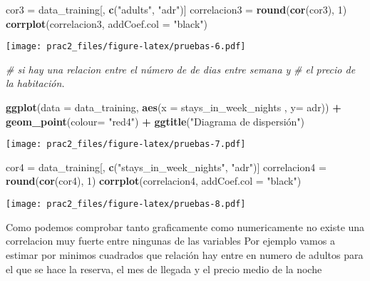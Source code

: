 \documentclass[]{article}
\newenvironment{Shaded}{\begin{snugshade}}{\end{snugshade}}
\newcommand{\CommentTok}[1]{\textcolor[rgb]{0.56,0.35,0.01}{\textit{#1}}}
\newcommand{\DataTypeTok}[1]{\textcolor[rgb]{0.13,0.29,0.53}{#1}}
\newcommand{\DecValTok}[1]{\textcolor[rgb]{0.00,0.00,0.81}{#1}}
\newcommand{\KeywordTok}[1]{\textcolor[rgb]{0.13,0.29,0.53}{\textbf{#1}}}
\newcommand{\NormalTok}[1]{#1}
\newcommand{\OperatorTok}[1]{\textcolor[rgb]{0.81,0.36,0.00}{\textbf{#1}}}
\newcommand{\StringTok}[1]{\textcolor[rgb]{0.31,0.60,0.02}{#1}}
\begin{document}
\begin{Shaded}
\begin{Highlighting}[]
\NormalTok{cor3 =}\StringTok{ }\NormalTok{data_training[, }\KeywordTok{c}\NormalTok{(}\StringTok{"adults"}\NormalTok{, }\StringTok{"adr"}\NormalTok{)]}
\NormalTok{correlacion3 =}\StringTok{ }\KeywordTok{round}\NormalTok{(}\KeywordTok{cor}\NormalTok{(cor3), }\DecValTok{1}\NormalTok{)}
\KeywordTok{corrplot}\NormalTok{(correlacion3, }\DataTypeTok{addCoef.col =} \StringTok{"black"}\NormalTok{)}
\end{Highlighting}
\end{Shaded}

\texttt{[image: prac2\_files/figure-latex/pruebas-6.pdf]}

\begin{Shaded}
\begin{Highlighting}[]
\CommentTok{# si hay una relacion entre el número de de dias entre semana  y}
\CommentTok{# el precio de la habitación.}

\KeywordTok{ggplot}\NormalTok{(}\DataTypeTok{data =}\NormalTok{ data_training, }\KeywordTok{aes}\NormalTok{(}\DataTypeTok{x =}\NormalTok{ stays_in_week_nights , }\DataTypeTok{y=}\NormalTok{ adr)) }\OperatorTok{+}
\StringTok{  }\KeywordTok{geom_point}\NormalTok{(}\DataTypeTok{colour=} \StringTok{"red4"}\NormalTok{) }\OperatorTok{+}
\StringTok{  }\KeywordTok{ggtitle}\NormalTok{(}\StringTok{"Diagrama de dispersión")}
\end{Highlighting}
\end{Shaded}

\texttt{[image: prac2\_files/figure-latex/pruebas-7.pdf]}

\begin{Shaded}
\begin{Highlighting}[]
\NormalTok{cor4 =}\StringTok{ }\NormalTok{data_training[, }\KeywordTok{c}\NormalTok{(}\StringTok{"stays_in_week_nights"}\NormalTok{, }\StringTok{"adr"}\NormalTok{)]}
\NormalTok{correlacion4 =}\StringTok{ }\KeywordTok{round}\NormalTok{(}\KeywordTok{cor}\NormalTok{(cor4), }\DecValTok{1}\NormalTok{)}
\KeywordTok{corrplot}\NormalTok{(correlacion4, }\DataTypeTok{addCoef.col =} \StringTok{"black"}\NormalTok{)}
\end{Highlighting}
\end{Shaded}

\texttt{[image: prac2\_files/figure-latex/pruebas-8.pdf]}

Como podemos comprobar tanto graficamente como numericamente no existe
una correlacion muy fuerte entre ningunas de las variables Por ejemplo
vamos a estimar por minimos cuadrados que relación hay entre en numero
de adultos para el que se hace la reserva, el mes de llegada y el precio
medio de la noche
\end{document}
